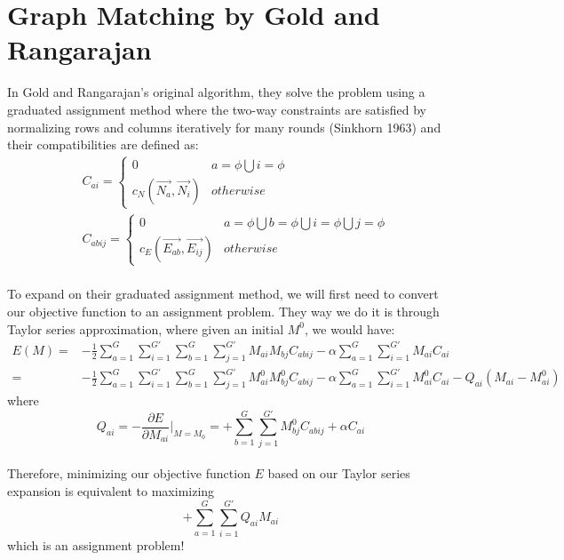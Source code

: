 \section{Graph Matching by Gold and Rangarajan}

In Gold and Rangarajan's original algorithm, they solve the problem using a graduated assignment method where the two-way constraints are satisfied by normalizing rows and columns iteratively for many rounds (Sinkhorn 1963) and their compatibilities are defined as:
\begin{align} 
& C_{ai}  = \begin{cases}0 & a=\phi \bigcup i=\phi \\c_N(\overrightarrow{N_{a}},\overrightarrow{N_{i}}) & otherwise\end{cases} \label{eq:2}\\
& C_{abij} = \begin{cases}0 & a=\phi \bigcup b=\phi \bigcup i=\phi \bigcup j=\phi \\c_E(\overrightarrow{E_{ab}},\overrightarrow{E_{ij}}) & otherwise\end{cases} \label{eq:3}
\end{align}\\

To expand on their graduated assignment method, we will first need to convert our objective function to an assignment problem. They way we do it is through Taylor series approximation, where given an initial $M^0$, we would have:
\begin{align}
E(M) = & -\frac{1}{2}\sum_{a=1}^{G}\sum_{i=1}^{G'}\sum_{b=1}^{G}\sum_{j=1}^{G'}M_{ai}M_{bj}C_{abij}-\alpha\sum_{a=1}^{G}\sum_{i=1}^{G'}M_{ai}C_{ai}\nonumber\\
= & -\frac{1}{2}\sum_{a=1}^{G}\sum_{i=1}^{G'}\sum_{b=1}^{G}\sum_{j=1}^{G'}M_{ai}^{0}M_{bj}^{0}C_{abij}-\alpha\sum_{a=1}^{G}\sum_{i=1}^{G'}M_{ai}^{0}C_{ai} - Q_{ai}(M_{ai}-M_{ai}^{0})\label{eq:4}
\end{align}
where
\begin{equation} \label{eq:5}
Q_{ai}=-\frac{\partial E}{\partial M_{ai}}\bigg\rvert_{M=M_0}=+\sum_{b=1}^{G}\sum_{j=1}^{G'}M_{bj}^{0}C_{abij}+\alpha C_{ai}
\end{equation}\\

Therefore, minimizing our objective function $E$ based on our Taylor series expansion is equivalent to maximizing 
\begin{equation} \label{eq:6}
+\sum_{a=1}^{G}\sum_{i=1}^{G'}Q_{ai}M_{ai}
\end{equation}
which is an assignment problem!\\

